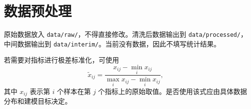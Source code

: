 \section{数据预处理}

原始数据放入 \texttt{data/raw/}，不得直接修改。清洗后数据输出到 \texttt{data/processed/}，中间数据输出到 \texttt{data/interim/}。当前没有数据，因此不填写统计结果。

若需要对指标进行极差标准化，可使用
\begin{equation}
  \tilde{x}_{ij}
  =
  \frac{x_{ij} - \min_i x_{ij}}{\max_i x_{ij} - \min_i x_{ij}},
  \label{eq:min-max-normalization}
\end{equation}
其中 $x_{ij}$ 表示第 $i$ 个样本在第 $j$ 个指标上的原始取值。是否使用该式应由具体数据分布和建模目标决定。
